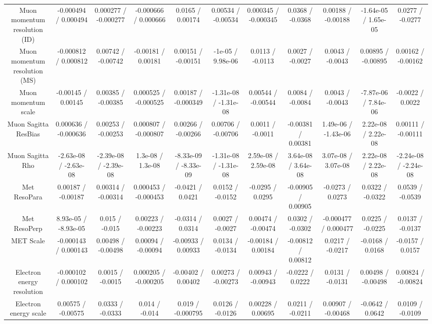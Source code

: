 \begin{table}[htbp]
\begin{center}
\begin{tabular}{|c|c|c|c|c|c|c|c|c|c|c|}
  Muon momentum resolution (ID) & -0.000494 / 0.000494 & 0.000277 / -0.000277 & -0.000666 / 0.000666 & 0.0165 / 0.00174 & 0.00534 / -0.00534 & 0.000345 / -0.000345 & 0.0368 / -0.0368 & 0.00188 / -0.00188 & -1.64e-05 / 1.65e-05 & 0.0277 / -0.0277 \\ 
  Muon momentum resolution (MS) & -0.000812 / 0.000812 & 0.00742 / -0.00742 & -0.00181 / 0.00181 & 0.00151 / -0.00151 & -1e-05 / 9.98e-06 & 0.0113 / -0.0113 & 0.0027 / -0.0027 & 0.0043 / -0.0043 & 0.00895 / -0.00895 & 0.00162 / -0.00162 \\ 
  Muon momentum scale & -0.00145 / 0.00145 & 0.00385 / -0.00385 & 0.000525 / -0.000525 & 0.00187 / -0.000349 & -1.31e-08 / -1.31e-08 & 0.00544 / -0.00544 & 0.0084 / -0.0084 & 0.0043 / -0.0043 & -7.87e-06 / 7.84e-06 & -0.0022 / 0.0022 \\ 
  Muon Sagitta ResBias & 0.000636 / -0.000636 & 0.00253 / -0.00253 & 0.000807 / -0.000807 & 0.00266 / -0.00266 & 0.00706 / -0.00706 & 0.0011 / -0.0011 & -0.00381 / 0.00381 & 1.49e-06 / -1.43e-06 & 2.22e-08 / 2.22e-08 & 0.00111 / -0.00111 \\ 
  Muon Sagitta Rho & -2.63e-08 / -2.63e-08 & -2.39e-08 / -2.39e-08 & 1.3e-08 / 1.3e-08 & -8.33e-09 / -8.33e-09 & -1.31e-08 / -1.31e-08 & 2.59e-08 / 2.59e-08 & 3.64e-08 / 3.64e-08 & 3.07e-08 / 3.07e-08 & 2.22e-08 / 2.22e-08 & -2.24e-08 / -2.24e-08 \\ 
  Met ResoPara & 0.00187 / -0.00187 & 0.00314 / -0.00314 & 0.000453 / -0.000453 & -0.0421 / 0.0421 & 0.0152 / -0.0152 & -0.0295 / 0.0295 & -0.00905 / 0.00905 & -0.0273 / 0.0273 & 0.0322 / -0.0322 & 0.0539 / -0.0539 \\ 
  Met ResoPerp & 8.93e-05 / -8.93e-05 & 0.015 / -0.015 & 0.00223 / -0.00223 & -0.0314 / 0.0314 & 0.0027 / -0.0027 & 0.00474 / -0.00474 & 0.0302 / -0.0302 & -0.000477 / 0.000477 & 0.0225 / -0.0225 & 0.0137 / -0.0137 \\ 
  MET Scale & -0.000143 / 0.000143 & 0.00498 / -0.00498 & 0.00094 / -0.00094 & -0.00933 / 0.00933 & 0.0134 / -0.0134 & -0.00184 / 0.00184 & -0.00812 / 0.00812 & 0.0217 / -0.0217 & -0.0168 / 0.0168 & -0.0157 / 0.0157 \\ 
  Electron energy resolution & -0.000102 / 0.000102 & 0.0015 / -0.0015 & 0.000205 / -0.000205 & -0.00402 / 0.00402 & 0.00273 / -0.00273 & 0.00943 / -0.00943 & -0.0222 / 0.0222 & 0.0131 / -0.0131 & 0.00498 / -0.00498 & 0.00824 / -0.00824 \\ 
  Electron energy scale & 0.00575 / -0.00575 & 0.0333 / -0.0333 & 0.014 / -0.014 & 0.019 / -0.000795 & 0.0126 / -0.0126 & 0.00228 / 0.00695 & 0.0211 / -0.0211 & 0.00907 / -0.00468 & -0.0642 / 0.0642 & 0.0109 / -0.0109 \\ 

\end{tabular}
\end{center}
\end{table}
